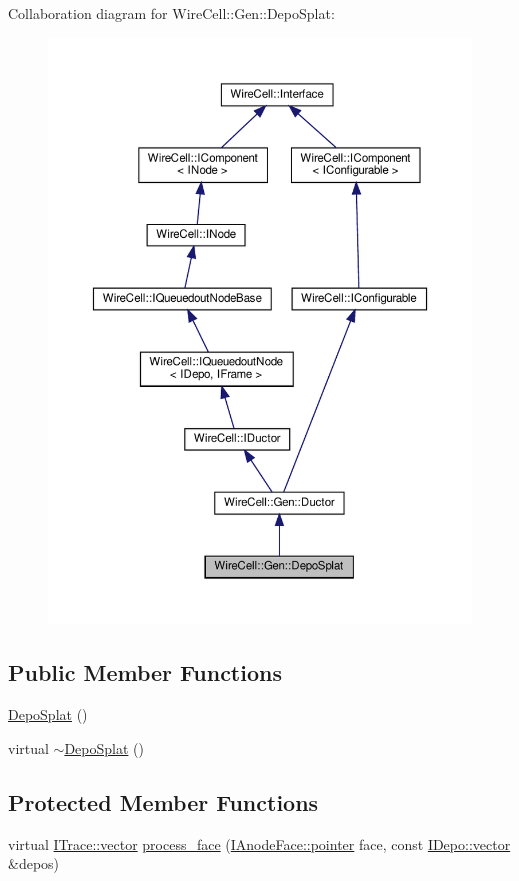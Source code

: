 Collaboration diagram for Wire\+Cell\+:\+:Gen\+:\+:Depo\+Splat\+:
\nopagebreak
\begin{figure}[H]
\begin{center}
\leavevmode
\includegraphics[width=350pt]{class_wire_cell_1_1_gen_1_1_depo_splat__coll__graph}
\end{center}
\end{figure}
\subsection*{Public Member Functions}
\begin{DoxyCompactItemize}
\item 
\hyperlink{class_wire_cell_1_1_gen_1_1_depo_splat_a61faac2e22fe11c53faa115e7791d028}{Depo\+Splat} ()
\item 
virtual \hyperlink{class_wire_cell_1_1_gen_1_1_depo_splat_a17af1de378c9998d704d32eff9eb1fe9}{$\sim$\+Depo\+Splat} ()
\end{DoxyCompactItemize}
\subsection*{Protected Member Functions}
\begin{DoxyCompactItemize}
\item 
virtual \hyperlink{class_wire_cell_1_1_i_data_ae1a9f863380499bb43f39fabb6276660}{I\+Trace\+::vector} \hyperlink{class_wire_cell_1_1_gen_1_1_depo_splat_a53de1c32277ad2c62b0f81760f8dcdc8}{process\+\_\+face} (\hyperlink{class_wire_cell_1_1_interface_a09c548fb8266cfa39afb2e74a4615c37}{I\+Anode\+Face\+::pointer} face, const \hyperlink{class_wire_cell_1_1_i_data_ae1a9f863380499bb43f39fabb6276660}{I\+Depo\+::vector} \&depos)
\end{DoxyCompactItemize}

